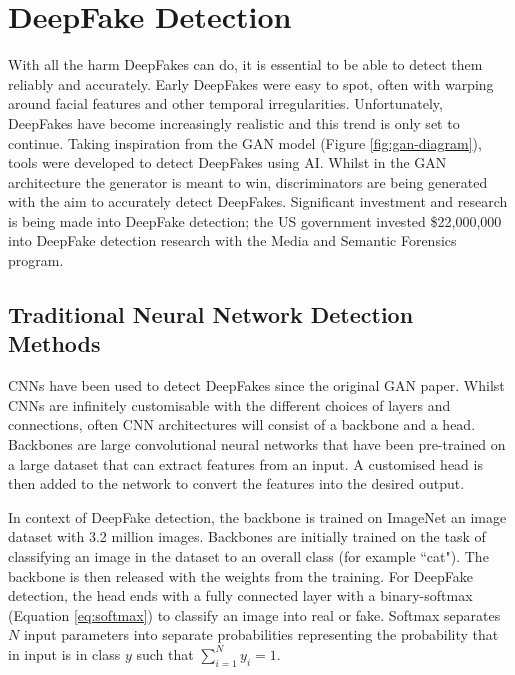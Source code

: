 \section{DeepFake Detection}

With all the harm DeepFakes can do, it is essential to be able to detect them reliably and accurately. Early DeepFakes were easy to spot, often with warping around facial features and other temporal irregularities\cite{diel2024human}. Unfortunately, DeepFakes have become increasingly realistic and this trend is only set to continue. Taking inspiration from the GAN model (Figure \ref{fig:gan-diagram}), tools were developed to detect DeepFakes using AI. Whilst in the GAN architecture the generator is meant to win, discriminators are being generated with the aim to accurately detect DeepFakes. Significant investment and research is being made into DeepFake detection; the US government invested \$22,000,000 into DeepFake detection research with the Media and Semantic Forensics program\cite{harris2023deep}.

\subsection{Traditional Neural Network Detection Methods}
\label{sec:traditional-cnns}

CNNs have been used to detect DeepFakes since the original GAN paper\cite{goodfellow2014generative}. Whilst CNNs are infinitely customisable with the different choices of layers and connections, often CNN architectures will consist of a backbone and a head\cite{elharrouss2024backbones}. Backbones are large convolutional neural networks that have been pre-trained on a large dataset that can extract features from an input. A customised head is then added to the network to convert the features into the desired output.

In context of DeepFake detection, the backbone is trained on ImageNet\cite{deng2009imagenet} an image dataset with 3.2 million images. Backbones are initially trained on the task of classifying an image in the dataset to an overall class (for example ``cat"). The backbone is then released with the weights from the training. For DeepFake detection, the head ends with a fully connected layer with a binary-softmax (Equation \ref{eq:softmax}) to classify an image into real or fake. Softmax separates $N$ input parameters into separate probabilities representing the probability that in input is in class $y$ such that $\sum^N_{i=1} y_i=1$. 

